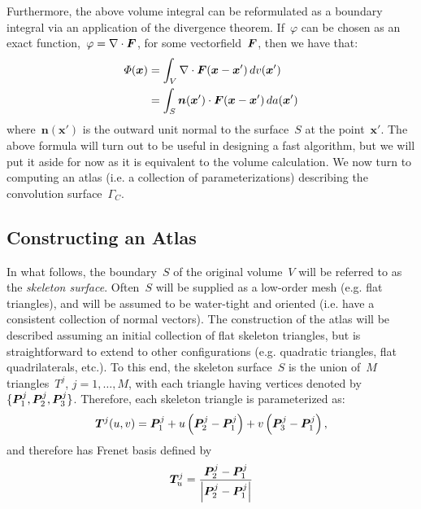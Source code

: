 \documentclass[11pt]{article}
\newcommand{\vct}{\vectorsym}
\newcommand{\lp}{\left(}
\newcommand{\rp}{\right)}
\newcommand\bx{\boldsymbol x}
\newcommand\bn{\boldsymbol n}
\renewcommand{\phi}{\varphi}
\begin{document}
Furthermore, the above volume integral can be reformulated as a
boundary integral via an application of the divergence
theorem. If~$\phi$ can be chosen as an exact
function,~$\phi = \nabla \cdot \vct{F}$, for some
vectorfield~$\vct{F}$, then we have that:
\begin{equation}
  \begin{aligned}
    \Phi(\bx) &= \int_{V} \nabla \cdot \vct{F}(\bx-\bx') \, dv(\bx') \\
    &= \int_{S} \bn(\bx') \cdot \vct{F}(\bx-\bx') \, da(\bx')
  \end{aligned}
\end{equation}
where~$\bn(\bx')$ is the outward unit normal to the surface~$S$ at the
point~$\bx'$. The above formula will turn out to be useful in
designing a fast algorithm, but we will put it aside for now as it is
equivalent to the volume calculation. We now turn to computing an
atlas (i.e. a collection of parameterizations) describing the
convolution surface~$\Gamma_C$.





\subsection{Constructing an Atlas}

In what follows, the boundary~$S$ of the original volume~$V$ will be
referred to as the \emph{skeleton surface}. Often~$S$ will be supplied
as a low-order mesh (e.g. flat triangles), and will be assumed to be
water-tight and oriented (i.e. have a consistent collection of normal
vectors). The construction of the atlas will be described assuming an
initial collection of flat skeleton triangles, but is straightforward
to extend to other configurations (e.g. quadratic triangles, flat
quadrilaterals, etc.). To this end, the skeleton surface~$S$ is the
union of~$M$ triangles~$T^j$, $j=1,\ldots,M$, with each triangle
having vertices denoted
by~$\{ \vct{P}^j_1,\vct{P}^j_2,\vct{P}^j_3 \} $.
Therefore, each skeleton triangle is parameterized as:
\begin{equation}
  \vct{T}^j(u,v) = \vct{P}^j_1 + u \lp \vct{P}^j_2 - \vct{P}^j_1 \rp
  + v \lp \vct{P}^j_3 - \vct{P}^j_1 \rp,
\end{equation}
and therefore has Frenet basis defined by
\begin{equation}
\vct{T}^j_u = \frac{\vct{P}^j_2 - \vct{P}^j_1}{\left| \vct{P}^j_2 -
    \vct{P}^j_1 \right|}
\end{equation}
\end{document}

